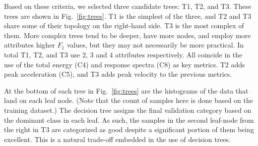 Based on these criteria, we selected three candidate trees: T1, T2, and T3. These trees are shown in Fig.~\ref{fig:trees}. T1 is the simplest of the three, and T2 and T3 share some of their topology on the right-hand side. T3 is the most complex of them. More complex trees tend to be deeper, have more nodes, and employ more attributes higher $F_1$ values, but they may not necessarily be more practical. In total T1, T2, and T3 use 2, 3 and 4 attributes respectively. All coincide in the use of the total energy (C4) and response spectra (C8) as key metrics. T2 adds peak acceleration (C5), and T3 adds peak velocity  to the previous metrics.

At the bottom of each tree in Fig.~\ref{fig:trees} are the histograms of the data that land on each leaf node. (Note that the count of samples here is done based on the training dataset.) The decision tree assigns the final validation category based on the dominant class in each leaf. As such, the samples in the second leaf-node from the right in T3 are categorized as good despite a significant portion of them being excellent. This is a natural trade-off embedded in the use of decision trees.

